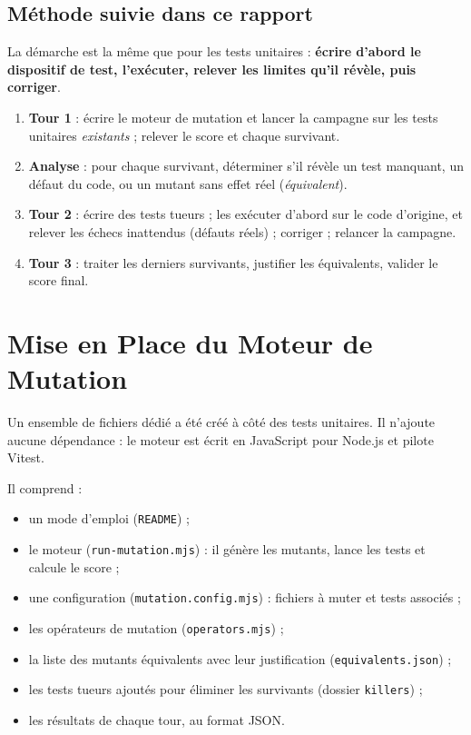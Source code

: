 \documentclass[12pt,a4paper]{article}
\begin{document}
\subsection{Méthode suivie dans ce rapport}
La démarche est la même que pour les tests unitaires : \textbf{écrire d'abord le dispositif de test, l'exécuter, relever les limites qu'il révèle, puis corriger}.
\begin{enumerate}
    \item \textbf{Tour 1} : écrire le moteur de mutation et lancer la campagne sur les tests unitaires \textit{existants} ; relever le score et chaque survivant.
    \item \textbf{Analyse} : pour chaque survivant, déterminer s'il révèle un test manquant, un défaut du code, ou un mutant sans effet réel (\textit{équivalent}).
    \item \textbf{Tour 2} : écrire des tests \og tueurs \fg{} ; les exécuter d'abord sur le code d'origine, et relever les échecs inattendus (défauts réels) ; corriger ; relancer la campagne.
    \item \textbf{Tour 3} : traiter les derniers survivants, justifier les équivalents, valider le score final.
\end{enumerate}

\section{Mise en Place du Moteur de Mutation}
Un ensemble de fichiers dédié a été créé à côté des tests unitaires. Il n'ajoute aucune dépendance : le moteur est écrit en JavaScript pour Node.js et pilote Vitest.

Il comprend :
\begin{itemize}
    \item un mode d'emploi (\texttt{README}) ;
    \item le moteur (\texttt{run-mutation.mjs}) : il génère les mutants, lance les tests et calcule le score ;
    \item une configuration (\texttt{mutation.config.mjs}) : fichiers à muter et tests associés ;
    \item les opérateurs de mutation (\texttt{operators.mjs}) ;
    \item la liste des mutants équivalents avec leur justification (\texttt{equivalents.json}) ;
    \item les tests tueurs ajoutés pour éliminer les survivants (dossier \texttt{killers}) ;
    \item les résultats de chaque tour, au format JSON.
\end{itemize}
\end{document}
